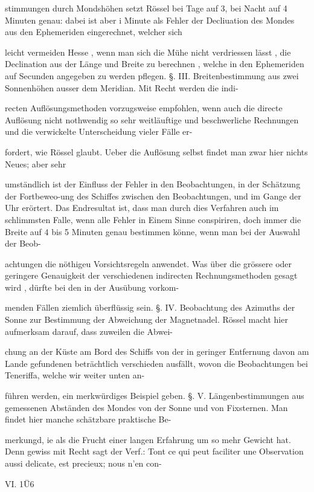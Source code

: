 \documentclass[10pt,a4paper]{article}
\begin{document}
stimmungen durch Mondshöhen setzt Rössel bei Tage auf 3, bei Nacht auf 4 Minuten genau: dabei ist aber i Minute als Fehler der Decliuation des Mondes aus den Ephemeriden eingerechnet, welcher sich

leicht vermeiden Hesse , wenn man sich die Mühe nicht verdriessen lässt , die Declination aus der Länge und Breite zu berechnen , welche in den Ephemeriden auf Secunden angegeben zu werden pflegen. §. III. Breitenbestimmung aus zwei Sonnenhöhen ausser dem Meridian. Mit Recht werden die indi-

recten Auflösungsmethoden vorzugsweise empfohlen, wenn auch die directe Auflösung nicht nothwendig so sehr weitläuftige und beschwerliche Rechnungen und die verwickelte Unterscheidung vieler Fälle er-

fordert, wie Rössel glaubt. Ueber die Auflösung selbst findet man zwar hier nichts Neues; aber sehr

umständlich ist der Einfluss der Fehler in den Beobachtungen, in der Schätzung der Fortbeweo-ung des Schiffes zwischen den Beobachtungen, und im Gange der Uhr erörtert. Das Endresultat ist, dass man durch dies Verfahren auch im schlimmsten Falle, wenn alle Fehler in Einem Sinne conspiriren, doch immer die Breite auf 4 bis 5 Minuten genau bestimmen könne, wenn man bei der Auswahl der Beob-

achtungen die nöthigeu Vorsichtsregeln anwendet. Was über die grössere oder geringere Genauigkeit der verschiedenen indirecten Rechnungsmethoden gesagt wird , dürfte bei den in der Ausübung vorkom-

menden Fällen ziemlich überflüssig sein. §. IV. Beobachtung des Azimuths der Sonne zur Bestimmung der Abweichung der Magnetnadel. Rössel macht hier aufmerksam darauf, dass zuweilen die Abwei-

chung an der Küste am Bord des Schiffs von der in geringer Entfernung davon am Lande gefundenen beträchtlich verschieden ausfällt, wovon die Beobachtungen bei Teneriffa, welche wir weiter unten an-

führen werden, ein merkwürdiges Beispiel geben. §. V. Längenbestimmungen aus gemessenen Abständen des Mondes von der Sonne und von Fixsternen. Man findet hier manche schätzbare praktische Be-

merkungd, ie als die Frucht einer langen Erfahrung um so mehr Gewicht hat. Denn gewiss mit Recht sagt der Verf.: Tont ce qui peut faciliter une Observation aussi delicate, est precieux; nous n'en con-

VI. 1Ü6
\end{document}
